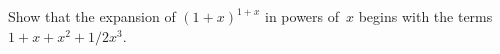 Show that the expansion of $(1 + x)^{1+x}$ in powers of~$x$ begins with the
terms $1 + x + x^{2} + 1/2 x^{3}$. 

